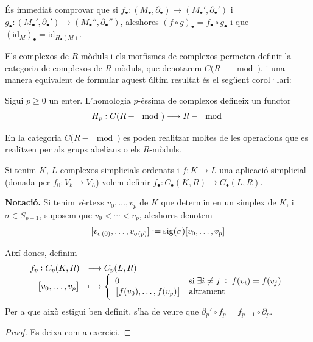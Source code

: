 \documentclass[../main.tex]{subfiles}
\begin{document}
És immediat comprovar que si $f_\bullet:(M_\bullet,\partial_\bullet)\rightarrow(M_\bullet',\partial_\bullet')$ i $g_\bullet:(M_\bullet',\partial_\bullet')\rightarrow(M_\bullet'',\partial_\bullet'')$, aleshores $(f\circ g)_\bullet= f_\bullet\circ g_\bullet$ i que $(\mathrm{id}_M)_\bullet = \mathrm{id}_{H_\bullet(M)}$.

Els complexos de $R$-mòduls i els morfismes de complexos permeten definir la categoria de complexos de $R$-mòduls, que denotarem $C(R-\mod)$, i una manera equivalent de formular aquest últim resultat és el següent corol·lari:

\begin{coro}
Sigui $p\geq 0$ un enter. L'homologia $p$-éssima de complexos defineix un functor
\begin{equation}
    \notag
    H_p:C(R-\mod)\longrightarrow R-\mod
\end{equation}
\end{coro}

En la categoria $C(R-\mod)$ es poden realitzar moltes de les operacions que es realitzen per als grups abelians o els $R$-mòduls. 




Si tenim $K$, $L$ complexos simplicials ordenats i $f:K\rightarrow L$ una aplicació simplicial (donada per $f_0:V_k\rightarrow V_L$) volem definir $f_\bullet:C_\bullet(K,R)\rightarrow C_\bullet(L,R)$. 

\textbf{Notació.} Si tenim vèrtexs $v_0,\ldots,v_p$ de $K$ que determin en un símplex de $K$, i $\sigma\in S_{p+1}$, suposem que $v_0<\cdots<v_p$, aleshores denotem
\begin{equation}
    \notag
    [v_{\sigma(0)},\ldots,v_{\sigma(p)}]:=\mathrm{sig}(\sigma)[v_0,\ldots,v_p]
\end{equation}

Així doncs, definim
\begin{equation}
    \notag
    \begin{array}{rl}
        f_p:C_p(K,R) & \longrightarrow C_p(L,R) \\
        \left[v_0,\ldots,v_p\right] & \longmapsto \left\{
        \begin{array}{ll}
            0 & \text{si}\;\exists i\not=j\;:\;f(v_i) = f(v_j)\\
            \left[f(v_0),\ldots,f(v_p)\right] & \text{altrament}
        \end{array}
        \right.
    \end{array}
\end{equation}
Per a que això estigui ben definit, s'ha de veure que $\partial_p'\circ f_p = f_{p-1}\circ \partial_p$.
\begin{proof}
Es deixa com a exercici.
\end{proof}
\end{document}
